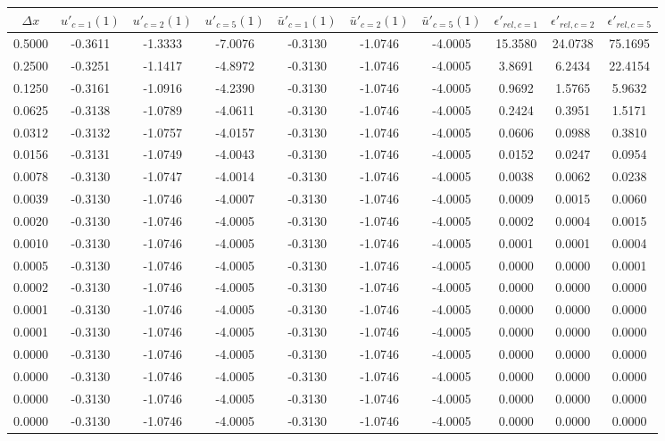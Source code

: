 \begin{tabular}{|c|c|c|c|c|c|c|c|c|c|}
\hline
\textbf{$\Delta x$}&\textbf{$u'_{c=1}(1)$}&\textbf{$u'_{c=2}(1)$}&\textbf{$u'_{c=5}(1)$}&\textbf{$\bar{u}'_{c=1}(1)$}&\textbf{$\bar{u}'_{c=2}(1)$}&\textbf{$\bar{u}'_{c=5}(1)$}&\textbf{$\epsilon'_{rel,c=1}$}&\textbf{$\epsilon'_{rel,c=2}$}&\textbf{$\epsilon'_{rel,c=5}$}\\\hline
0.5000&-0.3611&-1.3333&-7.0076&-0.3130&-1.0746&-4.0005&15.3580&24.0738&75.1695\\\hline
0.2500&-0.3251&-1.1417&-4.8972&-0.3130&-1.0746&-4.0005&3.8691&6.2434&22.4154\\\hline
0.1250&-0.3161&-1.0916&-4.2390&-0.3130&-1.0746&-4.0005&0.9692&1.5765&5.9632\\\hline
0.0625&-0.3138&-1.0789&-4.0611&-0.3130&-1.0746&-4.0005&0.2424&0.3951&1.5171\\\hline
0.0312&-0.3132&-1.0757&-4.0157&-0.3130&-1.0746&-4.0005&0.0606&0.0988&0.3810\\\hline
0.0156&-0.3131&-1.0749&-4.0043&-0.3130&-1.0746&-4.0005&0.0152&0.0247&0.0954\\\hline
0.0078&-0.3130&-1.0747&-4.0014&-0.3130&-1.0746&-4.0005&0.0038&0.0062&0.0238\\\hline
0.0039&-0.3130&-1.0746&-4.0007&-0.3130&-1.0746&-4.0005&0.0009&0.0015&0.0060\\\hline
0.0020&-0.3130&-1.0746&-4.0005&-0.3130&-1.0746&-4.0005&0.0002&0.0004&0.0015\\\hline
0.0010&-0.3130&-1.0746&-4.0005&-0.3130&-1.0746&-4.0005&0.0001&0.0001&0.0004\\\hline
0.0005&-0.3130&-1.0746&-4.0005&-0.3130&-1.0746&-4.0005&0.0000&0.0000&0.0001\\\hline
0.0002&-0.3130&-1.0746&-4.0005&-0.3130&-1.0746&-4.0005&0.0000&0.0000&0.0000\\\hline
0.0001&-0.3130&-1.0746&-4.0005&-0.3130&-1.0746&-4.0005&0.0000&0.0000&0.0000\\\hline
0.0001&-0.3130&-1.0746&-4.0005&-0.3130&-1.0746&-4.0005&0.0000&0.0000&0.0000\\\hline
0.0000&-0.3130&-1.0746&-4.0005&-0.3130&-1.0746&-4.0005&0.0000&0.0000&0.0000\\\hline
0.0000&-0.3130&-1.0746&-4.0005&-0.3130&-1.0746&-4.0005&0.0000&0.0000&0.0000\\\hline
0.0000&-0.3130&-1.0746&-4.0005&-0.3130&-1.0746&-4.0005&0.0000&0.0000&0.0000\\\hline
0.0000&-0.3130&-1.0746&-4.0005&-0.3130&-1.0746&-4.0005&0.0000&0.0000&0.0000\\\hline
\end{tabular}
